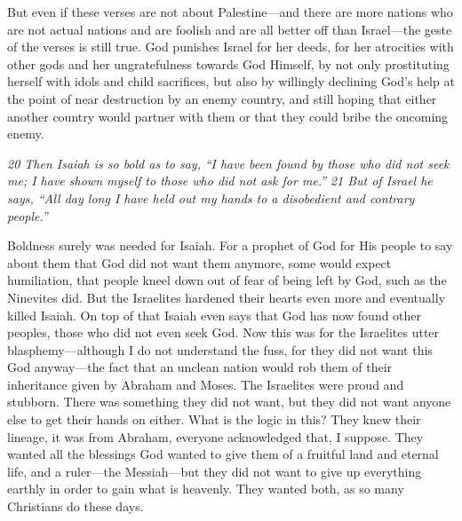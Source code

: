 But even if these verses are not about Palestine---and there are more
nations who are not actual nations and are foolish and are all better
off than Israel---the geste of the verses is still true. God punishes
Israel for her deeds, for her atrocities with other gods and her
ungratefulness towards God Himself, by not only prostituting herself
with idols and child sacrifices, but also by willingly declining God's
help at the point of near destruction by an enemy country, and still
hoping that either another country would partner with them or that they
could bribe the oncoming enemy.

\emph{20 Then Isaiah is so bold as to say,} \emph{``I have been found by
those who did not seek me; I have shown myself to those who did
not ask for me.''} \emph{21 But of Israel he says, ``All day long I have
held out my hands to a disobedient and contrary people.''}

Boldness surely was needed for Isaiah. For a prophet of God for His
people to say about them that God did not want them anymore, some would
expect humiliation, that people kneel down out of fear of being left by
God, such as the Ninevites did. But the Israelites hardened their hearts
even more and eventually killed Isaiah. On top of that Isaiah even says
that God has now found other peoples, those who did not even seek God.
Now this was for the Israelites utter blasphemy---although I do not
understand the fuss, for they did not want this God anyway---the fact
that an unclean nation would rob them of their inheritance given by
Abraham and Moses. The Israelites were proud and stubborn. There was
something they did not want, but they did not want anyone else to get
their hands on either. What is the logic in this? They knew their
lineage, it was from Abraham, everyone acknowledged that, I suppose.
They wanted all the blessings God wanted to give them of a fruitful land
and eternal life, and a ruler---the Messiah---but they did not want to
give up everything earthly in order to gain what is heavenly. They
wanted both, as so many Christians do these days.

